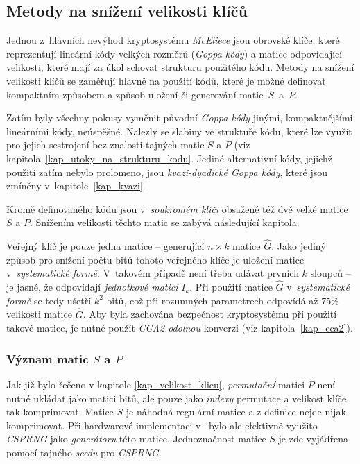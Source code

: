 \documentclass[thesis=M,czech,hidelinks]{FITthesis}[2012/06/26]
\newcommand{\0}{{\textcolor[gray]{0.80}{0}}}
\begin{document}
\subsection{Metody na snížení velikosti klíčů}\label{kap_snizeni_velikosti_klicu}
Jednou z~hlavních nevýhod kryptosystému \emph{McEliece} jsou obrovské klíče,
které reprezentují lineární kódy velkých rozměrů (\emph{Goppa kódy}) a matice
odpovídající velikosti, které mají za úkol schovat strukturu použitého kódu.
Metody na snížení velikosti klíčů se zaměřují hlavně na použití kódů, které je
možné definovat kompaktním způsobem a způsob uložení či generování
matic~$S$~a~$P$.

Zatím byly všechny pokusy vyměnit původní \emph{Goppa kódy} jinými,
kompaktnějšími lineárními kódy, neúspěšné. Nalezly se slabiny ve struktuře kódu,
které lze využít pro jejich sestrojení bez znalosti tajných matic $S$ a $P$ (viz
kapitola~\ref{kap_utoky_na_strukturu_kodu}. Jediné alternativní kódy, jejichž
použití zatím nebylo prolomeno, jsou \emph{kvazi-dyadické Goppa kódy}, které
jsou zmíněny v~kapitole~\ref{kap_kvazi}.

Kromě definovaného kódu jsou v~\emph{soukromém klíči} obsažené též dvě velké
matice $S$ a $P$. Snížením velikosti těchto matic se zabývá následující
kapitola.

Veřejný klíč je pouze jedna matice --  generující $n \times k$ matice
$\hat{G}$. Jako jediný způsob pro snížení počtu bitů tohoto veřejného klíče je
uložení matice v~\emph{systematické formě}. V~takovém případě není třeba
udávat prvních $k$ sloupců -- je jasné, že odpovídají \emph{jednotkové matici}
$I_k$. Při použití matice $\hat{G}$ v~\emph{systematické formě} se tedy ušetří
$k^2$ bitů, což při rozumných parametrech odpovídá až $75 $\;\% velikosti matice
$\hat{G}$. Aby byla zachována bezpečnost kryptosystému při použití takové
matice, je nutné použít \emph{CCA2-odolnou} konverzi (viz kapitola~\ref{kap_cca2}).

\subsubsection{Význam matic $S$ a $P$}
Jak již bylo řečeno v kapitole \ref{kap_velikost_klicu}, \emph{permutační}
matici $P$ není nutné ukládat jako matici bitů, ale pouze jako \emph{indexy}
permutace a velikost klíče tak komprimovat. Matice $S$ je náhodná regulární
matice a z definice nejde nijak komprimovat. Při hardwarové implementaci
v~\cite{Paustjan} bylo ale efektivně využito \emph{CSPRNG} jako
\emph{generátoru} této matice. Jednoznačnost matice $S$ je zde vyjádřena pomocí
tajného \emph{seedu} pro \emph{CSPRNG}.
\end{document}
